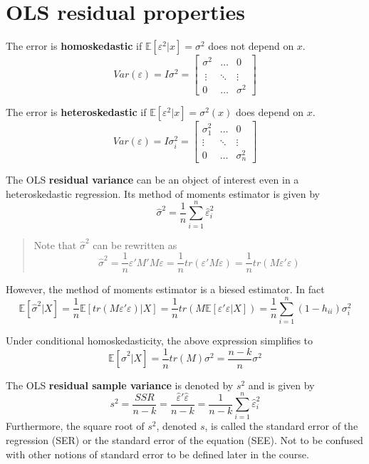 \documentclass[12pt,]{book}
\begin{document}
\hypertarget{ols-residual-properties}{%
\section{OLS residual properties}\label{ols-residual-properties}}

The error is \textbf{homoskedastic} if \(\mathbb E [\varepsilon^2 | x] = \sigma^2\) does not depend on \(x\).
\[
    Var(\varepsilon) = I \sigma^2 = \begin{bmatrix}
    \sigma^2 & \dots & 0 \\\\\
    \vdots & \ddots & \vdots \\
    0 & \dots & \sigma^2
    \end{bmatrix}
\]

The error is \textbf{heteroskedastic} if \(\mathbb E [\varepsilon^2 | x] = \sigma^2(x)\) does depend on \(x\).
\[
    Var(\varepsilon) = I \sigma_i^2 = 
    \begin{bmatrix}
    \sigma_1^2 & \dots & 0 \\
    \vdots & \ddots & \vdots \\
    0 & \dots & \sigma_n^2 
    \end{bmatrix}
\]

The OLS \textbf{residual variance} can be an object of interest even in a heteroskedastic regression. Its method of moments estimator is given by
\[
  \hat \sigma^2 = \frac{1}{n} \sum _ {i=1}^n \hat \varepsilon_i^2
\]

\begin{quote}
Note that \(\hat \sigma^2\) can be rewritten as
\[
\hat \sigma^2 = \frac{1}{n} \varepsilon' M' M \varepsilon = \frac{1}{n} tr(\varepsilon' M \varepsilon) = \frac{1}{n} tr(M \varepsilon' \varepsilon)
\]
\end{quote}

However, the method of moments estimator is a biesed estimator. In fact
\[
  \mathbb E[\hat \sigma^2 | X] = \frac{1}{n} \mathbb E [ tr(M \varepsilon' \varepsilon) | X] =  \frac{1}{n} tr( M\mathbb E[\varepsilon' \varepsilon |X]) = \frac{1}{n} \sum _ {i=1}^n (1-h_{ii}) \sigma^2_i
\]

Under conditional homoskedasticity, the above expression simplifies to
\[
  \mathbb E[\hat \sigma^2 | X] = \frac{1}{n} tr(M) \sigma^2 = \frac{n-k}{n} \sigma^2
\]

The OLS \textbf{residual sample variance} is denoted by \(s^2\) and is given by
\[
  s^2 = \frac{SSR}{n-k} = \frac{\hat \varepsilon'\hat \varepsilon}{n-k} = \frac{1}{n-k}\sum _ {i=1}^n \hat \varepsilon_i^2
\]
Furthermore, the square root of \(s^2\), denoted \(s\), is called the standard error of the regression (SER) or the standard error of the equation (SEE). Not to be confused with other notions of standard error to be defined later in the course.
\end{document}
